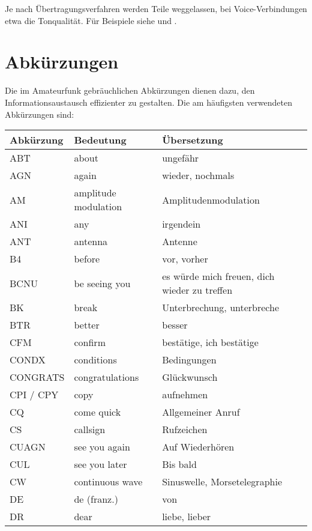 Je nach Übertragungsverfahren werden Teile weggelassen, bei Voice-Verbindungen etwa die Tonqualität. Für Beispiele siehe  und .

\pagebreak[4]
\section{Abkürzungen}
Die im Amateurfunk gebräuchlichen Abkürzungen dienen dazu, den Informationsaustausch effizienter zu gestalten. Die am häufigsten verwendeten Abkürzungen sind:

{

\begin{longtabu} to \linewidth{lll}
\rowfont \bfseries Abkürzung & Bedeutung &  Übersetzung \\
\toprule
\endhead
{}
ABT & about & ungefähr \\ \midrule
AGN & again & wieder, nochmals \\ \midrule
AM & amplitude modulation & Amplitudenmodulation \\ \midrule
ANI & any & irgendein \\ \midrule
ANT & antenna & Antenne \\ \midrule
B4 & before & vor, vorher \\ \midrule
BCNU & be seeing you & es würde mich freuen, dich  wieder zu treffen \\ \midrule
BK & break & Unterbrechung, unterbreche \\ \midrule
BTR & better & besser \\ \midrule
CFM & confirm & bestätige, ich bestätige \\ \midrule
CONDX & conditions & Bedingungen \\ \midrule
CONGRATS & congratulations & Glückwunsch \\ \midrule
CPI / CPY & copy & aufnehmen \\ \midrule
CQ & come quick & Allgemeiner Anruf \\ \midrule
CS & callsign & Rufzeichen \\ \midrule
CUAGN & see you again & Auf Wiederhören \\ \midrule
CUL & see you later & Bis bald \\ \midrule
CW & continuous wave & Sinuswelle, Morsetelegraphie \\ \midrule
DE & de (franz.) & von \\ \midrule
DR & dear & liebe, lieber \\ \midrule

\end{longtabu}}
